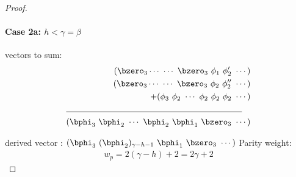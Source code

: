 \documentclass[11pt, oneside, dvipdfmx]{book}
\begin{document}
\begin{proof}
\newpage
\paragraph{Case 2a: $h<\gamma=\beta$ \newline}
 vectors to sum:
\begin{align*}
(\bzero_3\cdots~\cdots~\bzero_3~\phi_1~\phi'_2~\cdots)\\
(\bzero_3\cdots~\cdots~\bzero_3~\phi_2~\phi''_2~\cdots)\\
+(\phi_3~\phi_2~\cdots~\phi_2~\phi_2~\phi_2~\cdots)\\
\cline{1-2}
(\bphi_3~\bphi_2~\cdots~\bphi_2~\bphi_1~\bzero_3~\cdots)
\end{align*}


derived vector : $(\bphi_3~(\bphi_2)_{\gamma-h-1}~\bphi_1~\bzero_3~\cdots)$
\newline
Parity weight: \begin{equation}
\begin{split}
w_p=2(\gamma-h)+2 =2\gamma+2
\end{split}
\end{equation}



\end{proof}
\end{document}
